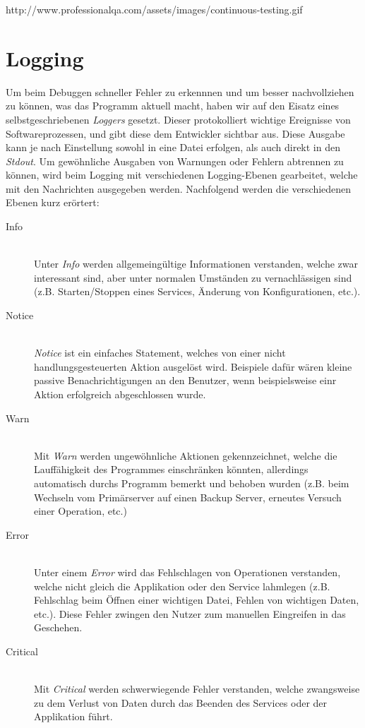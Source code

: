 http://www.professionalqa.com/assets/images/continuous-testing.gif
\\

\section{Logging}
Um beim Debuggen schneller Fehler zu erkennnen und um besser nachvollziehen zu
können, was das Programm aktuell macht, haben wir auf den Eisatz eines
selbstgeschriebenen \textit{Loggers} gesetzt. Dieser protokolliert wichtige
Ereignisse von Softwareprozessen, und gibt diese dem Entwickler sichtbar aus.
Diese Ausgabe kann je nach Einstellung sowohl in eine Datei erfolgen, als auch
direkt in den \textit{Stdout}. Um gewöhnliche Ausgaben von Warnungen oder
Fehlern abtrennen zu können, wird beim Logging mit verschiedenen Logging-Ebenen
gearbeitet, welche mit den Nachrichten ausgegeben werden. Nachfolgend werden
die verschiedenen Ebenen kurz erörtert:

\begin{description}
\item[Info] \hfil \\
Unter \textit{Info} werden allgemeingültige Informationen verstanden, welche zwar
interessant sind, aber unter normalen Umständen zu vernachlässigen sind (z.B.
Starten/Stoppen eines Services, Änderung von Konfigurationen, etc.).
\item[Notice] \hfil \\ 
\textit{Notice} ist ein einfaches Statement, welches von einer nicht
handlungsgesteuerten Aktion ausgelöst wird. Beispiele dafür wären kleine
passive Benachrichtigungen an den Benutzer, wenn beispielsweise einr Aktion
erfolgreich abgeschlossen wurde.
\item[Warn] \hfil \\ 
Mit \textit{Warn} werden ungewöhnliche Aktionen gekennzeichnet, welche die
Lauffähigkeit des Programmes einschränken könnten, allerdings
automatisch durchs Programm bemerkt und behoben wurden (z.B. beim Wechseln vom
Primärserver auf einen Backup Server, erneutes Versuch einer Operation, etc.)
\item[Error] \hfil \\ 
Unter einem \textit{Error} wird das Fehlschlagen von Operationen verstanden,
welche nicht gleich die Applikation oder den Service lahmlegen (z.B. Fehlschlag
beim Öffnen einer wichtigen Datei, Fehlen von wichtigen Daten, etc.). Diese
Fehler zwingen den Nutzer zum manuellen Eingreifen in das Geschehen.
\item[Critical] \hfil \\ 
Mit \textit{Critical} werden schwerwiegende Fehler verstanden, welche
zwangsweise zu dem Verlust von Daten durch das Beenden des Services
oder der Applikation führt.
\end{description}


